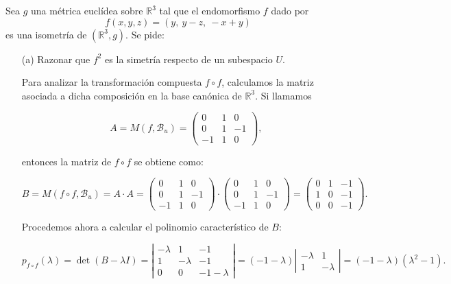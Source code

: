 \documentclass[12pt]{article}
\begin{document}
	\begin{ejercicio}[4 puntos]
		Sea $g$ una métrica euclídea sobre $\mathbb{R}^3$ tal que el endomorfismo $f$ dado por
		\[
		f(x, y, z) = (y,\ y - z,\ -x + y)
		\]
		es una isometría de $(\mathbb{R}^3, g)$. Se pide:
		\begin{enumerate}
			\item[(a)] Razonar que $f^2$ es la simetría respecto de un subespacio $U$.
			
					Para analizar la transformación compuesta \( f \circ f \), calculamos la matriz asociada a dicha composición en la base canónica de \( \mathbb{R}^3 \). Si llamamos
					
					\[
					A = M(f, \mathcal{B}_u) = \begin{pmatrix}
						0 & 1 & 0 \\
						0 & 1 & -1 \\
						-1 & 1 & 0
					\end{pmatrix},
					\]
					
					entonces la matriz de \( f \circ f \) se obtiene como:
					
					\[
					B = M(f \circ f, \mathcal{B}_u) = A \cdot A =
					\begin{pmatrix}
						0 & 1 & 0 \\
						0 & 1 & -1 \\
						-1 & 1 & 0
					\end{pmatrix}
					\cdot
					\begin{pmatrix}
						0 & 1 & 0 \\
						0 & 1 & -1 \\
						-1 & 1 & 0
					\end{pmatrix}
					=
					\begin{pmatrix}
						0 & 1 & -1 \\
						1 & 0 & -1 \\
						0 & 0 & -1
					\end{pmatrix}.
					\]
					
					\medskip
					
					Procedemos ahora a calcular el polinomio característico de \( B \):
					
					\[
					p_{f \circ f}(\lambda) = \det(B - \lambda I) =
					\left|
					\begin{array}{ccc}
						-\lambda & 1 & -1 \\
						1 & -\lambda & -1 \\
						0 & 0 & -1 - \lambda
					\end{array}
					\right|
					= (-1 - \lambda)
					\left|
					\begin{array}{cc}
						-\lambda & 1 \\
						1 & -\lambda
					\end{array}
					\right|
					= (-1 - \lambda)(\lambda^2 - 1).
					\]
					

\end{enumerate}
\end{ejercicio}
\end{document}
